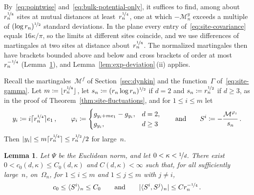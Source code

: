 \documentclass[11pt]{amsart}
\theoremstyle{plain}
\newtheorem{lemma}[theorem]{Lemma}
\theoremstyle{definition}
\newcommand{\drift}{\kappa}
\newcommand{\gauge}{\Psi}
\newcommand{\nf}{\nicefrac}
\numberwithin{equation}{section}
\begin{document}
By~\eqref{eq:pointwise} and~\eqref{eq:bulk-potential-only}, it suffices to find, among about~$r_n^{\nf18}$ sites at mutual distances at least~$r_n^{\nf14}$, one at which $-\mathcal M_n^y$ exceeds a multiple of $(\log r_n)^{\nf12}$ standard deviations. In the plane every entry of~\eqref{eq:site-covariance} equals $16\drift/\pi$, so the limits at different sites coincide, and we use differences of martingales at two sites at distance about~$r_n^{\nf18}$. The normalized martingales then have brackets bounded above and below and cross brackets of order at most~$r_n^{-\nf14}$ (Lemma~\ref{lem:separated-brackets}), and Lemma~\ref{lem:exp-deviation}\,(ii) applies.

Recall the martingales~$\mathcal M^f$ of Section~\ref{sec:dynkin} and the function~$\Gamma$ of~\eqref{eq:site-gamma}. Let $m\coloneqq\lfloor r_n^{\nf18}\rfloor$, let $s_n\coloneqq(r_n\log r_n)^{\nf12}$ if $d=2$ and $s_n\coloneqq r_n^{\nf12}$ if $d\geq3$, as in the proof of Theorem~\ref{thm:site-fluctuations}, and for $1\leq i\leq m$ let
\begin{equation*}
y_i\coloneqq i\lceil r_n^{\nf14}\rceil e_1\, ,\qquad
\varphi_i\coloneqq\begin{cases}g_{y_i+me_1}-g_{y_i},&d=2,\\g_{y_i},&d\geq3\end{cases}
\qquad\text{and}\qquad
S^i\coloneqq-\frac{\mathcal M^{\varphi_i}}{s_n}\, .
\end{equation*}
Then $|y_i|\leq m\lceil r_n^{\nf14}\rceil\leq r_n^{\nf12}/2$ for large~$n$.

\begin{lemma}\label{lem:separated-brackets}
Let $\gauge$ be the Euclidean norm, and let $0<\drift<\nf1d$. There exist $0<c_0(d,\drift)\leq C_0(d,\drift)$ and $C(d,\drift)<\infty$ such that, for all sufficiently large~$n$, on~$\Omega_n$, for $1\leq i\leq m$ and $1\leq j\leq m$ with $j\neq i$,
\begin{equation*}
c_0\leq\langle S^i\rangle_n\leq C_0
\qquad\text{and}\qquad
|\langle S^i,S^j\rangle_n|\leq Cr_n^{-\nf14}\, .
\end{equation*}
\end{lemma}
\end{document}
